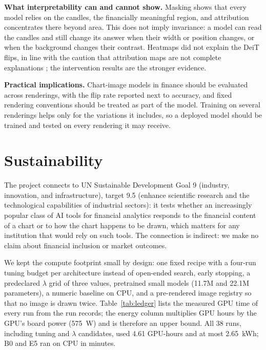 \documentclass[10pt,journal,compsoc]{IEEEtran}
\newif\ifshowdraft
\newcommand{\draft}[1]{\ifshowdraft\textcolor{red}{[#1]}\fi}
\newcommand{\gen}[2]{\IfFileExists{generated/#1}{}{\draft{#2}}}
\begin{document}
\textbf{What interpretability can and cannot show.} Masking shows that every model relies on the candles, the financially meaningful region, and attribution concentrates there beyond area. This does not imply invariance: a model can read the candles and still change its answer when their width or position changes, or when the background changes their contrast. Heatmaps did not explain the DeiT flips, in line with the caution that attribution maps are not complete explanations \cite{adebayo2018sanity, jain2019attention}; the intervention results are the stronger evidence.

\textbf{Practical implications.} Chart-image models in finance should be evaluated across renderings, with the flip rate reported next to accuracy, and fixed rendering conventions should be treated as part of the model. Training on several renderings helps only for the variations it includes, so a deployed model should be trained and tested on every rendering it may receive.

\section{Sustainability}\label{sec:sustain}
The project connects to UN Sustainable Development Goal 9 (industry, innovation, and infrastructure), target 9.5 (enhance scientific research and the technological capabilities of industrial sectors): it tests whether an increasingly popular class of AI tools for financial analytics responds to the financial content of a chart or to how the chart happens to be drawn, which matters for any institution that would rely on such tools. The connection is indirect: we make no claim about financial inclusion or market outcomes.

We kept the compute footprint small by design: one fixed recipe with a four-run tuning budget per architecture instead of open-ended search, early stopping, a predeclared $\lambda$ grid of three values, pretrained small models (11.7M and 22.1M parameters), a numeric baseline on CPU, and a pre-rendered image registry so that no image is drawn twice. Table~\ref{tab:ledger} lists the measured GPU time of every run from the run records; the energy column multiplies GPU hours by the GPU's board power (575~W) and is therefore an upper bound. All 38 runs, including tuning and $\lambda$ candidates, used 4.61 GPU-hours and at most 2.65~kWh; B0 and E5 ran on CPU in minutes.
\gen{tables/table_ledger.tex}{Compute ledger, generated by scripts/compute\_ledger.py}
\end{document}
